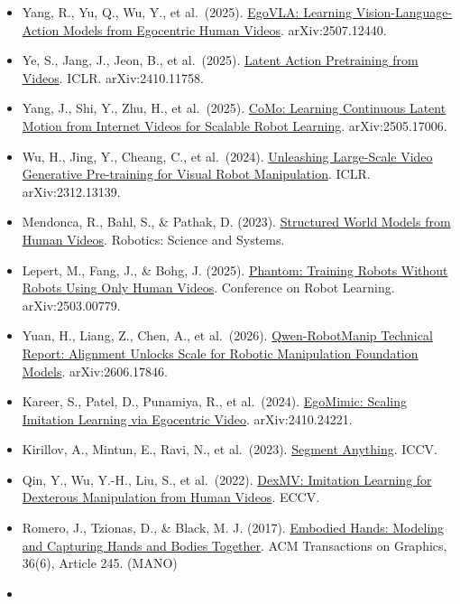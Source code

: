\begin{itemize}
\item
  Yang, R., Yu, Q., Wu, Y., et al.~(2025). \href{https://arxiv.org/abs/2507.12440}{EgoVLA: Learning Vision-Language-Action Models from Egocentric Human Videos}. arXiv:2507.12440.
\item
  Ye, S., Jang, J., Jeon, B., et al.~(2025). \href{https://openreview.net/forum?id=VYOe2eBQeh}{Latent Action Pretraining from Videos}. ICLR. arXiv:2410.11758.
\item
  Yang, J., Shi, Y., Zhu, H., et al.~(2025). \href{https://arxiv.org/abs/2505.17006}{CoMo: Learning Continuous Latent Motion from Internet Videos for Scalable Robot Learning}. arXiv:2505.17006.
\item
  Wu, H., Jing, Y., Cheang, C., et al.~(2024). \href{https://openreview.net/forum?id=NxoFmGgWC9}{Unleashing Large-Scale Video Generative Pre-training for Visual Robot Manipulation}. ICLR. arXiv:2312.13139.
\item
  Mendonca, R., Bahl, S., \& Pathak, D. (2023). \href{https://arxiv.org/abs/2308.10901}{Structured World Models from Human Videos}. Robotics: Science and Systems.
\item
  Lepert, M., Fang, J., \& Bohg, J. (2025). \href{https://proceedings.mlr.press/v305/lepert25a.html}{Phantom: Training Robots Without Robots Using Only Human Videos}. Conference on Robot Learning. arXiv:2503.00779.
\item
  Yuan, H., Liang, Z., Chen, A., et al.~(2026). \href{https://arxiv.org/abs/2606.17846}{Qwen-RobotManip Technical Report: Alignment Unlocks Scale for Robotic Manipulation Foundation Models}. arXiv:2606.17846.
\item
  Kareer, S., Patel, D., Punamiya, R., et al.~(2024). \href{https://arxiv.org/abs/2410.24221}{EgoMimic: Scaling Imitation Learning via Egocentric Video}. arXiv:2410.24221.
\item
  Kirillov, A., Mintun, E., Ravi, N., et al.~(2023). \href{https://openaccess.thecvf.com/content/ICCV2023/html/Kirillov_Segment_Anything_ICCV_2023_paper.html}{Segment Anything}. ICCV.
\item
  Qin, Y., Wu, Y.-H., Liu, S., et al.~(2022). \href{https://arxiv.org/abs/2108.05877}{DexMV: Imitation Learning for Dexterous Manipulation from Human Videos}. ECCV.
\item
  Romero, J., Tzionas, D., \& Black, M. J. (2017). \href{https://doi.org/10.1145/3130800.3130883}{Embodied Hands: Modeling and Capturing Hands and Bodies Together}. ACM Transactions on Graphics, 36(6), Article 245. (MANO)
\item

\end{itemize}
